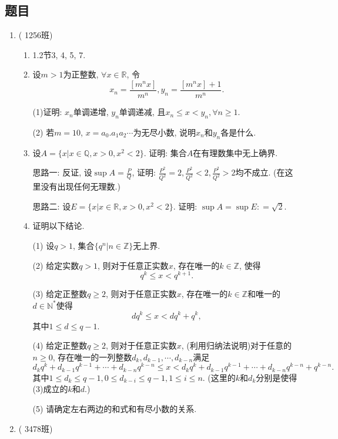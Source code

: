 \documentclass[UTF8,11pt, a4paper, oneside, fontset=none]{ctexbook}
\begin{document}
\subsection*{题目}
\begin{enumerate}

\item ({\color{purple} 1256班})

\begin{enumerate}
\item 1.2节3, 4, 5, 7.
\item 设$m > 1$为正整数, $\forall x \in \mathbb R$, 令
\[
x_n = \frac{[m^n x]}{m^n}, y_n = \frac{[m^n x] +1}{m^n}.
\]

(1)证明: $x_n$单调递增, $y_n$单调递减, 且$x_n \leq x < y_n, \forall n \geq 1$.

(2) 若$m =10$, $x = a_0. a_1 a_2 \cdots$为无尽小数, 说明$x_n$和$y_n$各是什么.

\item 设$A = \{x | x \in \mathbb Q, x >0, x^2 < 2 \}$. 证明: 集合$A$在有理数集中无上确界.

思路一: 反证, 设$\sup A = \frac{P}{Q}$, 证明: $\frac{P^2}{Q^2} =2, \frac{P^2}{Q^2} < 2, \frac{P^2}{Q^2} >2$均不成立. (在这里没有出现任何无理数.)

思路二: 设$E = \{x | x \in \mathbb R, x >0, x^2 < 2 \}$. 证明: $\sup A = \sup E : = \sqrt 2$.

\item 证明以下结论.

(1) 设$q > 1$, 集合$\{ q^n | n \in \mathbb Z\}$无上界.

(2) 给定实数$q>1$, 则对于任意正实数$x$, 存在唯一的$k \in \mathbb Z$, 使得
\[
q^{k} \leq x < q^{k+1}.
\]

(3) 给定正整数$q \geq 2$, 则对于任意正实数$x$, 存在唯一的$k \in \mathbb Z$和唯一的$d \in \mathbb N^*$使得
\[
d q^k \leq x < d q^k + q^k,
\]
其中$1 \leq d \leq q-1$.

(4) 给定正整数$q \geq 2$, 则对于任意正实数$x$, (利用归纳法说明)对于任意的$n \geq 0$, 存在唯一的一列整数$d_k, d_{k-1}, \cdots, d_{k-n}$满足
\[
d_k q^k + d_{k-1} q^{k-1} + \cdots + d_{k-n} q^{k-n} \leq x <d_k q^k + d_{k-1} q^{k-1} + \cdots + d_{k-n} q^{k-n}  + q^{k-n}.
\]
其中$1 \leq d_k \leq q-1, 0 \leq d_{k-i} \leq q-1, 1 \leq i \leq n$.
(这里的$k$和$d_k$分别是使得(3)成立的$k$和$d$.) 

(5) 请确定左右两边的和式和有尽小数的关系.

\end{enumerate}

\item ({\color{purple} 3478班})


\end{enumerate}
\end{document}
